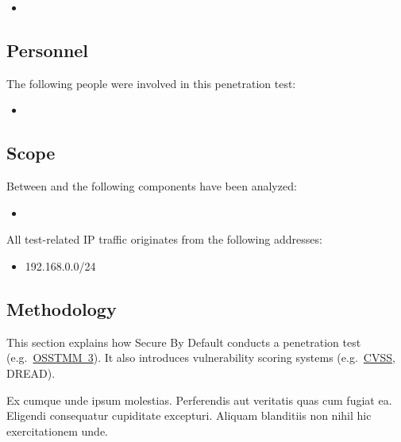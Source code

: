 \begin{itemize}
    \item {}
\end{itemize}

\subsection{Personnel}

The following people were involved in this penetration test:

\begin{itemize}
    \item {}
\end{itemize}

\subsection{Scope}

Between  and  the following components have been analyzed:

\begin{itemize}
    \item {}
\end{itemize}

All test-related IP traffic originates from the following addresses:

\begin{itemize}
  \item \passthrough{192.168.0.0/24}
\end{itemize}

\subsection{Methodology}

This section explains how Secure By Default conducts a penetration test
(e.g.\ \href{https://www.isecom.org/OSSTMM.3.pdf}{OSSTMM~3}).
It also introduces vulnerability scoring systems (e.g.\ \href{https://www.first.org/cvss/v3.1/specification-document}{CVSS}, DREAD).

Ex cumque unde ipsum molestias.
Perferendis aut veritatis quas cum fugiat ea.
Eligendi consequatur cupiditate excepturi.
Aliquam blanditiis non nihil hic exercitationem unde.

